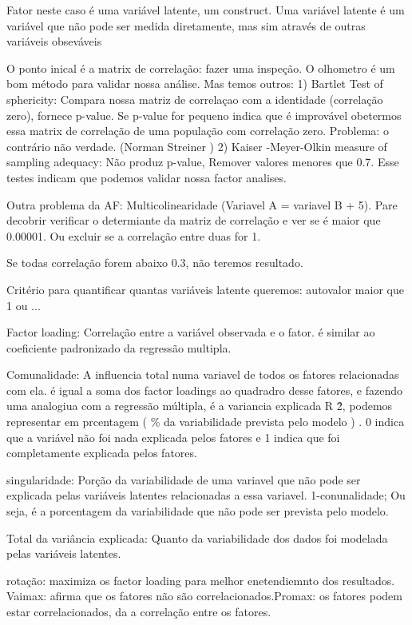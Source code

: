 Fator neste caso é uma variável latente, um construct. Uma variável latente é um variável que não pode ser medida diretamente, mas sim através de outras variáveis obseváveis

O ponto inical é a matrix de correlação: fazer uma inspeção. 
O olhometro é um bom método para validar nossa análise. Mas temos outros:
1) Bartlet Test of sphericity: Compara nossa matriz de correlaçao com a identidade (correlação zero), fornece p-value. Se p-value for pequeno indica que é improvável obetermos essa matrix de correlação de uma população com correlação zero. Problema: o contrário não verdade. (Norman Streiner )
2) Kaiser -Meyer-Olkin measure of sampling adequacy: Não produz p-value, Remover valores menores que 0.7.
Esse testes indicam que podemos validar nossa factor analises. 

Outra problema da AF: Multicolinearidade (Variavel A = variavel B + 5). Pare decobrir verificar o determiante da matriz de correlação e ver se é maior que 0.00001. Ou excluir se a correlação entre duas for  1. 

Se todas correlação forem abaixo 0.3, não teremos resultado.

Critério para quantificar quantas variáveis latente queremos: autovalor maior que 1 ou ...

Factor loading: Correlação entre a variável observada e o fator. é similar ao coeficiente padronizado da regressão multipla. 

Comunalidade: A influencia total numa variavel de todos os fatores relacionadas com ela. é igual a soma dos factor loadings ao quadradro desse fatores, e fazendo uma analogiua com a regressão múltipla, é a variancia explicada R \^2, podemos representar em prcentagem ( \% da variabilidade prevista pelo modelo ) . 0 indica que a variável não foi nada explicada pelos fatores e 1 indica que foi completamente explicada pelos fatores. 

singularidade: Porção da variabilidade de uma variavel que não pode ser explicada pelas variáveis latentes relacionadas a essa variavel. 1-conunalidade; Ou seja, é a porcentagem da variabilidade que não pode ser prevista pelo modelo.

Total da variância explicada: Quanto da variabilidade dos dados foi modelada pelas variáveis latentes. 

rotação: maximiza os factor loading para melhor enetendiemnto dos resultados. Vaimax: afirma que os fatores não são correlacionados.Promax: os fatores podem estar correlacionados, da a correlação entre os fatores. 


